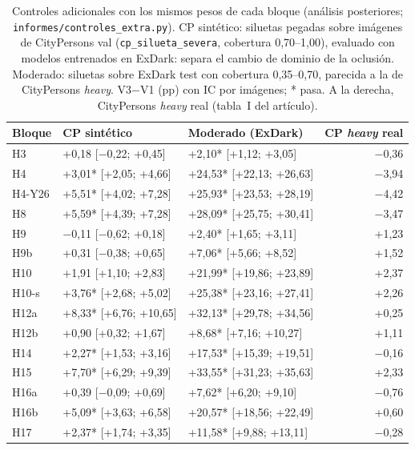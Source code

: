 \begin{table}[H]\centering\scriptsize
\caption{Controles adicionales con los mismos pesos de cada bloque (análisis posteriores; \texttt{informes/controles\_extra.py}). CP sintético: siluetas pegadas sobre imágenes de CityPersons val (\texttt{cp\_silueta\_severa}, cobertura 0,70--1,00), evaluado con modelos entrenados en ExDark: separa el cambio de dominio de la oclusión. Moderado: siluetas sobre ExDark test con cobertura 0,35--0,70, parecida a la de CityPersons \emph{heavy}. V3$-$V1 (pp) con IC por imágenes; * pasa. A la derecha, CityPersons \emph{heavy} real (tabla~I del artículo).}\label{tab:s-controles-extra}
\begin{tabular}{@{}l ll r@{}}\toprule
Bloque & CP sintético & Moderado (ExDark) & CP \emph{heavy} real \\
\midrule
H3 & +0{,}18 [$-$0{,}22; +0{,}45] & +2{,}10* [+1{,}12; +3{,}05] & $-$0{,}36 \\
H4 & +3{,}01* [+2{,}05; +4{,}66] & +24{,}53* [+22{,}13; +26{,}63] & $-$3{,}94 \\
H4-Y26 & +5{,}51* [+4{,}02; +7{,}28] & +25{,}93* [+23{,}53; +28{,}19] & $-$4{,}42 \\
H8 & +5{,}59* [+4{,}39; +7{,}28] & +28{,}09* [+25{,}75; +30{,}41] & $-$3{,}47 \\
H9 & $-$0{,}11 [$-$0{,}62; +0{,}18] & +2{,}40* [+1{,}65; +3{,}11] & +1{,}23 \\
H9b & +0{,}31 [$-$0{,}38; +0{,}65] & +7{,}06* [+5{,}66; +8{,}52] & +1{,}52 \\
H10 & +1{,}91 [+1{,}10; +2{,}83] & +21{,}99* [+19{,}86; +23{,}89] & +2{,}37 \\
H10-s & +3{,}76* [+2{,}68; +5{,}02] & +25{,}38* [+23{,}16; +27{,}41] & +2{,}26 \\
H12a & +8{,}33* [+6{,}76; +10{,}65] & +32{,}13* [+29{,}78; +34{,}56] & +0{,}25 \\
H12b & +0{,}90 [+0{,}32; +1{,}67] & +8{,}68* [+7{,}16; +10{,}27] & +1{,}11 \\
H14 & +2{,}27* [+1{,}53; +3{,}16] & +17{,}53* [+15{,}39; +19{,}51] & $-$0{,}16 \\
H15 & +7{,}70* [+6{,}29; +9{,}39] & +33{,}55* [+31{,}23; +35{,}63] & +2{,}33 \\
H16a & +0{,}39 [$-$0{,}09; +0{,}69] & +7{,}62* [+6{,}20; +9{,}10] & $-$0{,}76 \\
H16b & +5{,}09* [+3{,}63; +6{,}58] & +20{,}57* [+18{,}56; +22{,}49] & +0{,}60 \\
H17 & +2{,}37* [+1{,}74; +3{,}35] & +11{,}58* [+9{,}88; +13{,}11] & $-$0{,}28 \\
\bottomrule\end{tabular}\end{table}
